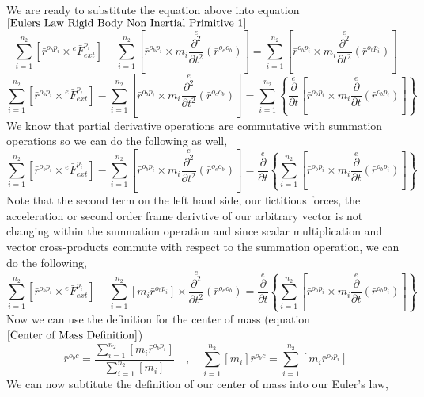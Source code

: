 We are ready to substitute the equation above into equation $\ref{Eulers Law Rigid Body Non Inertial Primitive 1}$
$$\sum^{n_{2}}_{i = 1}\left[\bar{r}^{o_{b}p_{i}}\times{}^{e}\bar{F}^{p_{i}}_{ext}\right] - \sum^{n_{2}}_{i = 1}\left[\bar{r}^{o_{b}p_{i}}\times m_{i}\overset{e}{\frac{\partial^{2}}{\partial t^{2}}}(\bar{r}^{o_{e}o_{b}})\right]
 = \sum^{n_{2}}_{i = 1}\left[\bar{r}^{o_{b}p_{i}}\times m_{i}\overset{e}{\frac{\partial^{2}}{\partial t^{2}}}(\bar{r}^{o_{b}p_{i}})\right] $$
$$\sum^{n_{2}}_{i = 1}\left[\bar{r}^{o_{b}p_{i}}\times{}^{e}\bar{F}^{p_{i}}_{ext}\right] - \sum^{n_{2}}_{i = 1}\left[\bar{r}^{o_{b}p_{i}}\times m_{i}\overset{e}{\frac{\partial^{2}}{\partial t^{2}}}(\bar{r}^{o_{e}o_{b}})\right]
 = \sum^{n_{2}}_{i = 1}\left\{\overset{e}{\frac{\partial}{\partial t}}\left[ \bar{r}^{o_{b}p_{i}}\times m_{i}\overset{e}{\frac{\partial}{\partial t}}\left(\bar{r}^{o_{b}p_{i}}\right) \right]\right\}$$
We know that partial derivative operations are commutative with summation operations so we can do the following as well,
$$\sum^{n_{2}}_{i = 1}\left[\bar{r}^{o_{b}p_{i}}\times{}^{e}\bar{F}^{p_{i}}_{ext}\right] - \sum^{n_{2}}_{i = 1}\left[\bar{r}^{o_{b}p_{i}}\times m_{i}\overset{e}{\frac{\partial^{2}}{\partial t^{2}}}(\bar{r}^{o_{e}o_{b}})\right]
= \overset{e}{\frac{\partial}{\partial t}}\left\{\sum^{n_{2}}_{i = 1}\left[ \bar{r}^{o_{b}p_{i}}\times m_{i}\overset{e}{\frac{\partial}{\partial t}}\left(\bar{r}^{o_{b}p_{i}}\right)\right]\right\}$$
Note that the second term on the left hand side, our fictitious forces, the acceleration or second order frame derivtive of our arbitrary vector is not changing within the summation operation and since scalar multiplication and vector cross-products commute with respect to the summation operation, we can do the following,
$$\sum^{n_{2}}_{i = 1}\left[\bar{r}^{o_{b}p_{i}}\times{}^{e}\bar{F}^{p_{i}}_{ext}\right] - \sum^{n_{2}}_{i = 1}\left[m_{i}\bar{r}^{o_{b}p_{i}}\right]\times \overset{e}{\frac{\partial^{2}}{\partial t^{2}}}(\bar{r}^{o_{e}o_{b}})
= \overset{e}{\frac{\partial}{\partial t}}\left\{\sum^{n_{2}}_{i = 1}\left[ \bar{r}^{o_{b}p_{i}}\times m_{i}\overset{e}{\frac{\partial}{\partial t}}\left(\bar{r}^{o_{b}p_{i}}\right)\right]\right\}$$
Now we can use the definition for the center of mass (equation $\ref{Center of Mass Definition}$)
$$\bar{r}^{o_{b}c} = \frac{\displaystyle \sum^{n_{2}}_{i = 1}\left[m_{i}\bar{r}^{o_{b}p_{i}}\right]}{\displaystyle \sum^{n_{2}}_{i = 1}\left[m_{i}\right]} \quad,\quad 
\sum^{n_{2}}_{i = 1}\left[m_{i}\right]\bar{r}^{o_{b}c} = \sum^{n_{2}}_{i = 1}\left[m_{i}\bar{r}^{o_{b}p_{i}}\right]$$
We can now subtitute the definition of our center of mass into our Euler's law,
